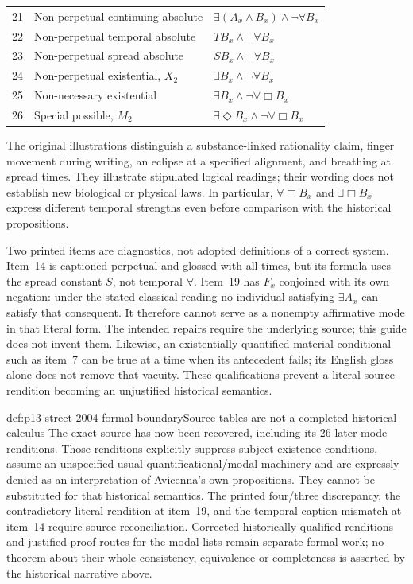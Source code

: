 \begin{longtable}{@{}r p{} p{}@{}}
21 & Non-perpetual continuing absolute & \(\exists(A_x\land B_x)\land\neg\forall B_x\) \\
22 & Non-perpetual temporal absolute & \(TB_x\land\neg\forall B_x\) \\
23 & Non-perpetual spread absolute & \(SB_x\land\neg\forall B_x\) \\
24 & Non-perpetual existential, \(X_2\) & \(\exists B_x\land\neg\forall B_x\) \\
25 & Non-necessary existential & \(\exists B_x\land\neg\forall\Box B_x\) \\
26 & Special possible, \(M_2\) & \(\exists\Diamond B_x\land\neg\forall\Box B_x\) \\
\bottomrule
\end{longtable}

The original illustrations distinguish a
substance-linked rationality claim, finger
movement during writing, an eclipse at a
specified alignment, and breathing at spread
times. They illustrate stipulated logical
readings; their wording does not establish
new biological or physical laws. In particular,
\(\forall\Box B_x\) and \(\exists\Box B_x\)
express different temporal strengths even
before comparison with the historical propositions.

Two printed items are diagnostics, not
adopted definitions of a correct system.
Item~14 is captioned perpetual and glossed
with all times, but its formula uses the
spread constant \(S\), not temporal \(\forall\).
Item~19 has \(F_x\) conjoined with its own
negation: under the stated classical reading
no individual satisfying \(\exists A_x\)
can satisfy that consequent. It therefore
cannot serve as a nonempty affirmative
mode in that literal form. The intended
repairs require the underlying source;
this guide does not invent them. Likewise,
an existentially quantified material
conditional such as item~7 can be true
at a time when its antecedent fails; its
English gloss alone does not remove that
vacuity. These qualifications prevent a
literal source rendition becoming an
unjustified historical semantics.

\begin{proofboundary}{def:p13-street-2004-formal-boundary}{Source tables are not a completed historical calculus}
The exact source has now been recovered,
including its 26 later-mode renditions.
Those renditions explicitly suppress subject
existence conditions, assume an unspecified
usual quantificational/modal machinery and
are expressly denied as an interpretation
of Avicenna's own propositions. They cannot
be substituted for that historical semantics.
The printed four/three discrepancy, the
contradictory literal rendition at item~19,
and the temporal-caption mismatch at item~14
require source reconciliation. Corrected
historically qualified renditions and justified proof
routes for the modal lists remain separate
formal work; no theorem about their whole
consistency, equivalence or completeness
is asserted by the historical narrative above.
\cite[pp.~592--596]{Street2004ArabicLogicHHL}
\end{proofboundary}
